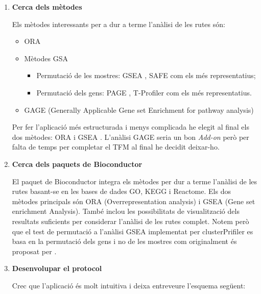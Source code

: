 \documentclass[]{article}
\begin{document}
\begin{enumerate}
\item \textbf{Cerca dels mètodes}

Els mètodes interessants per a dur a terme l'anàlisi de les rutes són:

\begin{itemize}
\item ORA \cite{boyle2004go}
\item Mètodes GSA
\begin{itemize} 
\item Permutació de les mostres: GSEA \cite{subramanian2005gene}, SAFE\cite{dinu2007improving} com els més representatius;
\item Permutació dels gens: PAGE \cite{kim2005page}, T-Profiler\cite{newton2007random} com els més representatius.
\end{itemize}
\item GAGE (Generally Applicable Gene set Enrichment for pathway analysis) \cite{luo2009gage}
\end{itemize}

Per fer l'aplicació més estructurada i menys complicada he elegit al final els dos mètodes: ORA \cite{boyle2004go} i GSEA \cite{subramanian2005gene}. L'anàlisi GAGE seria un bon \textit{Add-on} però per falta de temps per completar el TFM al final he decidit deixar-ho. 

\item \textbf{Cerca dels paquets de Bioconductor}

El paquet  de Bioconductor integra els mètodes per dur a terme l'anàlisi de les rutes basant-se en les bases de dades GO, KEGG i Reactome. Els dos mètodes principals són ORA (Overrepresentation analysis) i GSEA (Gene set enrichment Analysis). També inclou les possibilitats de visualització dels resultats suficients per considerar l'anàlisi de les rutes complet. Notem però que el test de permutació a l'anàlisi GSEA implementat per clusterPrifiler es basa en la permutació dels gens i no de les mostres com originalment és proposat per \cite{subramanian2005gene}.

\item \textbf{Desenvolupar el protocol}

Crec que l'aplicació és molt intuitiva i deixa entreveure l'esquema següent:


\end{enumerate}
\end{document}
